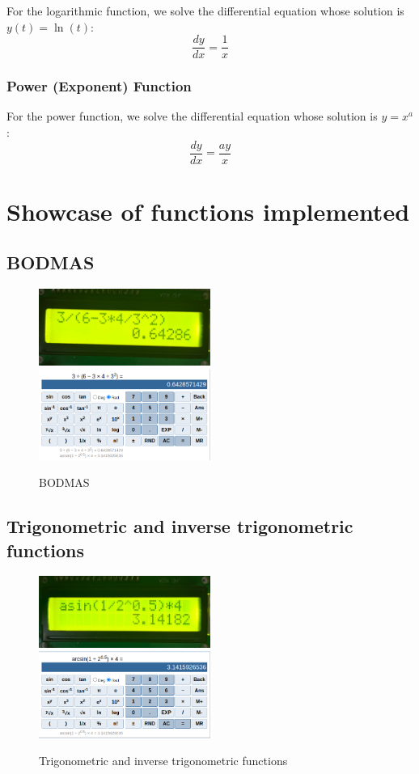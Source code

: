 \documentclass[a4paper,12pt]{article}
\begin{document}
For the logarithmic function, we solve the differential equation whose solution is \( y(t) = \ln(t) \):
\[
\frac{dy}{dx} = \frac{1}{x}
\]

\subsubsection{Power (Exponent) Function}

For the power function, we solve the differential equation whose solution is $y = x^a$:
\[
\frac{dy}{dx} = \frac{ay}{x}
\]

 \section{Showcase of functions implemented}
 \subsection{BODMAS}
 \begin{figure}[H]
     \centering
     {\includegraphics[width=0.5\textwidth]{figs/BODMAS1.jpeg}}
     \hfill
     {\includegraphics[width=0.5\textwidth]{figs/BODMAS_VERIFY.png}}
     \caption{BODMAS}
 \end{figure}
 \subsection{Trigonometric and inverse trigonometric functions}
 \begin{figure}[H]
     \centering
     {\includegraphics[width=0.5\textwidth]{figs/sin1.jpeg}}
     \hfill
     {\includegraphics[width=0.5\textwidth]{figs/SIN_VERIFY.png}}
     \caption{Trigonometric and inverse trigonometric functions}
 \end{figure}
\end{document}
